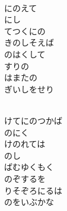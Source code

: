 \documentclass[10pt,b5j]{tarticle} %
\begin{document}
\vspace{1.5em} %
\newcommand{\linespace}{0.5em} %
\newcommand{\blocksize}{0.5\hsize} %
\newcommand{\itemmargin}{6em} %
\begin{enumerate} %
    \setlength{\itemindent}{\itemmargin} %
    \begin{minipage}[c]{\blocksize}
    
        \vspace{\linespace}
        \item~\\
        にのえて\\
        にし\\
        てつくにの\\
        きのしそえば\\
        のはくして\\
        すりの\\
        はまたの\\
        ぎいしをせり
        
        \vspace{\linespace}
        \item~\\
        けてにのつかば\\
        のにく\\
        けのれては\\
        のし\\
        ばむゆくもく\\
        のぞするを\\
        りそぞろにるは\\
        のをいぶかな
        

\end{minipage}
\end{enumerate}
\end{document}
